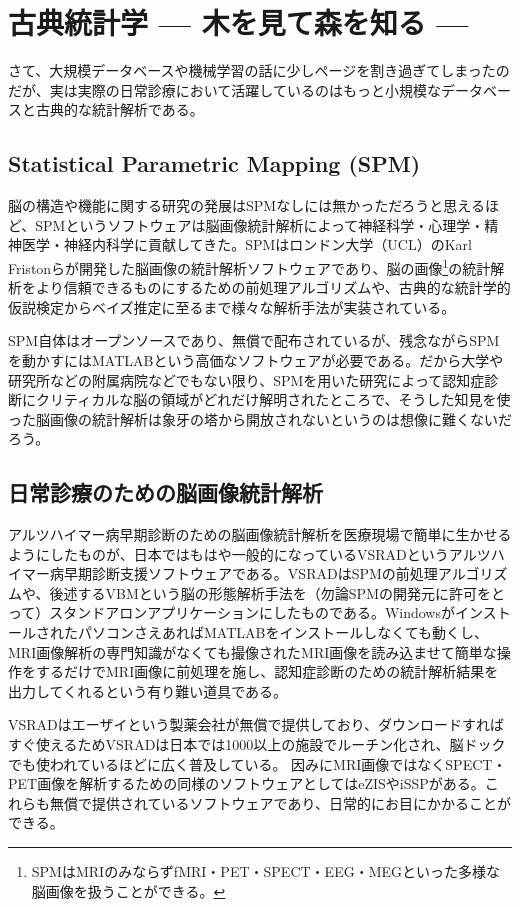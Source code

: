 \section{古典統計学 --- 木を見て森を知る ---}
さて、大規模データベースや機械学習の話に少しページを割き過ぎてしまったのだが、実は実際の日常診療において活躍しているのはもっと小規模なデータベースと古典的な統計解析である。

\subsection{Statistical Parametric Mapping (SPM)}
脳の構造や機能に関する研究の発展はSPMなしには無かっただろうと思えるほど、SPMというソフトウェアは脳画像統計解析によって神経科学・心理学・精神医学・神経内科学に貢献してきた。SPMはロンドン大学（UCL）のKarl Fristonらが開発した脳画像の統計解析ソフトウェアであり、脳の画像\footnote{SPMはMRIのみならずfMRI・PET・SPECT・EEG・MEGといった多様な脳画像を扱うことができる。}の統計解析をより信頼できるものにするための前処理アルゴリズムや、古典的な統計学的仮説検定からベイズ推定に至るまで様々な解析手法が実装されている。

SPM自体はオープンソースであり、無償で配布されているが、残念ながらSPMを動かすにはMATLABという高価なソフトウェアが必要である。だから大学や研究所などの附属病院などでもない限り、SPMを用いた研究によって認知症診断にクリティカルな脳の領域がどれだけ解明されたところで、そうした知見を使った脳画像の統計解析は象牙の塔から開放されないというのは想像に難くないだろう。
\subsection{日常診療のための脳画像統計解析}
アルツハイマー病早期診断のための脳画像統計解析を医療現場で簡単に生かせるようにしたものが、日本ではもはや一般的になっているVSRADというアルツハイマー病早期診断支援ソフトウェアである。VSRADはSPMの前処理アルゴリズムや、後述するVBMという脳の形態解析手法を（勿論SPMの開発元に許可をとって）スタンドアロンアプリケーションにしたものである。WindowsがインストールされたパソコンさえあればMATLABをインストールしなくても動くし、MRI画像解析の専門知識がなくても撮像されたMRI画像を読み込ませて簡単な操作をするだけでMRI画像に前処理を施し、認知症診断のための統計解析結果を出力してくれるという有り難い道具である。

VSRADはエーザイという製薬会社が無償で提供しており、ダウンロードすればすぐ使えるためVSRADは日本では1000以上の施設でルーチン化され、脳ドックでも使われているほどに広く普及している。
因みにMRI画像ではなくSPECT・PET画像を解析するための同様のソフトウェアとしてはeZISやiSSPがある。これらも無償で提供されているソフトウェアであり、日常的にお目にかかることができる。

